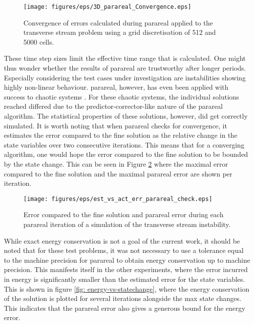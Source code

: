 \begin{figure}[h]
    \centering
    \texttt{[image: figures/eps/3D\_parareal\_Convergence.eps]}
    \caption{Convergence of errors calculated during parareal applied to the transverse stream problem using a grid discretisation of 512 and 5000 cells.}
    \label{fig: 1D-3V-parareal-convergence}
\end{figure}
These time step sizes limit the effective time range that is calculated. One might thus wonder whether the results of parareal are trustworthy after longer periods. Especially considering the test cases under investigation are instabilities showing highly non-linear behaviour. parareal, however, has even been applied with success to chaotic systems \cite{d_samaddar_parallelization_2010}. For these chaotic systems, the individual solutions reached differed due to the predictor-corrector-like nature of the parareal algorithm. The statistical properties of these solutions, however, did get correctly simulated.
It is worth noting that when parareal checks for convergence, it estimates the error compared to the fine solution as the relative change in the state variables over two consecutive iterations. This means that for a converging algorithm, one would hope the error compared to the fine solution to be bounded by the state change. This can be seen in Figure \ref{fig: error-vs-statechange} where the maximal error compared to the fine solution and the maximal parareal error are shown per iteration. 
\begin{figure}[h]
    \centering
    \texttt{[image: figures/eps/est\_vs\_act\_err\_parareal\_check.eps]}
    \caption{Error compared to the fine solution and parareal error during each parareal iteration of a simulation of the transverse stream instability.}
    \label{fig: error-vs-statechange}
\end{figure}

While exact energy conservation is not a goal of the current work, it should be noted that for these test problems, it was not necessary to use a tolerance equal to the machine precision for parareal to obtain energy conservation up to machine precision. This manifests itself in the other experiments, where the error incurred in energy is significantly smaller than the estimated error for the state variables. This is shown in figure \ref{fig: energy-vs-statechange}, where the energy conservation of the solution is plotted for several iterations alongside the max state changes. This indicates that the parareal error also gives a generous bound for the energy error.


